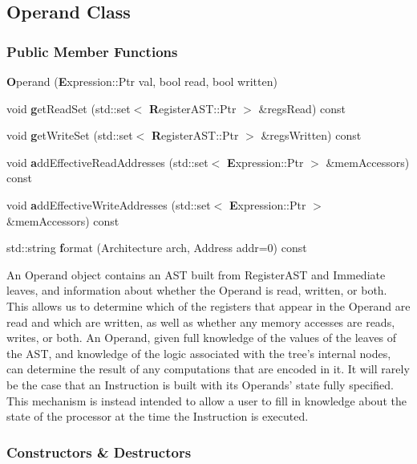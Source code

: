 \subsection{Operand Class}
\label{sec:operand}

\label{classDyninst_1_1InstructionAPI_1_1Operand}
\subsubsection*{Public Member Functions}
\begin{DoxyCompactItemize}
\item 
{\textbf Operand} ({\textbf Expression::Ptr} val, bool read, bool written)
\item 
 void {\textbf getReadSet} (std::set$<$ {\textbf RegisterAST::Ptr} $>$ \&regsRead) const 
\item 
 void {\textbf getWriteSet} (std::set$<$ {\textbf RegisterAST::Ptr} $>$ \&regsWritten) const 
\item 
 void {\textbf addEffectiveReadAddresses} (std::set$<$ {\textbf Expression::Ptr} $>$ \&memAccessors) const 
\item 
 void {\textbf addEffectiveWriteAddresses} (std::set$<$ {\textbf Expression::Ptr} $>$ \&memAccessors) const 
\item 
 std::string {\textbf format} (Architecture arch, Address addr=0) const 
\end{DoxyCompactItemize}



An Operand object contains an AST built from RegisterAST and Immediate leaves, and information about whether the Operand is read, written, or both. This allows us to determine which of the registers that appear in the Operand are read and which are written, as well as whether any memory accesses are reads, writes, or both. An Operand, given full knowledge of the values of the leaves of the AST, and knowledge of the logic associated with the tree's internal nodes, can determine the result of any computations that are encoded in it. It will rarely be the case that an Instruction is built with its Operands' state fully specified. This mechanism is instead intended to allow a user to fill in knowledge about the state of the processor at the time the Instruction is executed. 

\subsubsection{Constructors \& Destructors}
